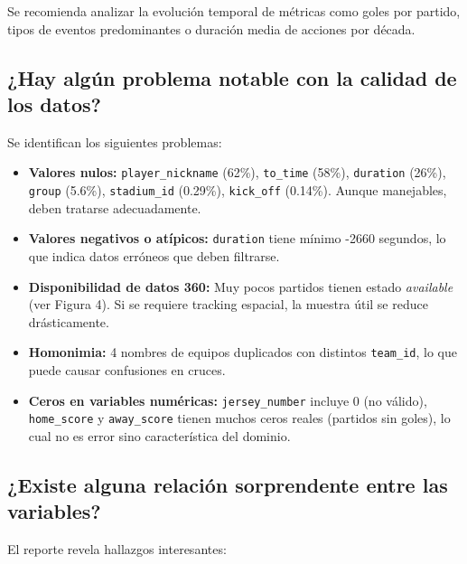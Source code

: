 \documentclass[12pt,a4paper]{article}
\begin{document}
Se recomienda analizar la evolución temporal de métricas como goles por partido, tipos de eventos predominantes o duración media de acciones por década.

\subsection{¿Hay algún problema notable con la calidad de los datos?}

Se identifican los siguientes problemas:

\begin{itemize}
    \item \textbf{Valores nulos:} \texttt{player\_nickname} (62\%), \texttt{to\_time} (58\%), \texttt{duration} (26\%), \texttt{group} (5.6\%), \texttt{stadium\_id} (0.29\%), \texttt{kick\_off} (0.14\%). Aunque manejables, deben tratarse adecuadamente.
    \item \textbf{Valores negativos o atípicos:} \texttt{duration} tiene mínimo -2660 segundos, lo que indica datos erróneos que deben filtrarse.
    \item \textbf{Disponibilidad de datos 360:} Muy pocos partidos tienen estado \emph{available} (ver Figura 4). Si se requiere tracking espacial, la muestra útil se reduce drásticamente.
    \item \textbf{Homonimia:} 4 nombres de equipos duplicados con distintos \texttt{team\_id}, lo que puede causar confusiones en cruces.
    \item \textbf{Ceros en variables numéricas:} \texttt{jersey\_number} incluye 0 (no válido), \texttt{home\_score} y \texttt{away\_score} tienen muchos ceros reales (partidos sin goles), lo cual no es error sino característica del dominio.
\end{itemize}

\subsection{¿Existe alguna relación sorprendente entre las variables?}

El reporte revela hallazgos interesantes:
\end{document}
